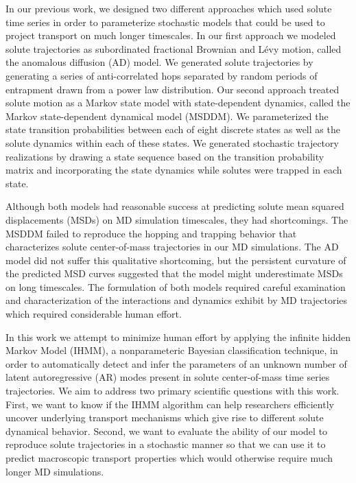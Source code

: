 \documentclass{article}
\begin{document}
  
  In our previous work, we designed two different approaches which used
  solute time series in order to parameterize stochastic models that could be used
  to project transport on much longer timescales. In our first approach we modeled 
  solute trajectories as subordinated fractional Brownian and L\'evy motion, called
  the anomalous diffusion (AD) model. We generated solute trajectories by generating
  a series of anti-correlated hops separated by random periods of entrapment drawn 
  from a power law distribution. Our second approach treated solute motion as a Markov
  state model with state-dependent dynamics, called the Markov state-dependent dynamical
  model (MSDDM). We parameterized the state transition probabilities between
  each of eight discrete states as well as the solute dynamics within each of these
  states. We generated stochastic trajectory realizations by drawing a state
  sequence based on the transition probability matrix and incorporating the state dynamics
  while solutes were trapped in each state.
  
  Although both models had reasonable success at predicting solute mean squared 
  displacements (MSDs) on MD simulation timescales, they had shortcomings.
  The MSDDM failed to reproduce the hopping and trapping behavior that
  characterizes solute center-of-mass trajectories in our MD simulations.
  The AD model did not suffer this qualitative shortcoming, but the persistent 
  curvature of the predicted MSD curves suggested that the model might 
  underestimate MSDs on long timescales. The formulation of both models required
  careful examination and characterization of the interactions and dynamics exhibit
  by MD trajectories which required considerable human effort.
  
  In this work we attempt to minimize human effort by applying the infinite hidden 
  Markov Model (IHMM), a nonparameteric Bayesian classification technique, in order to 
  automatically detect and infer the parameters of an unknown number of latent
  autoregressive (AR) modes present in solute center-of-mass time series trajectories.
  We aim to address two primary scientific questions with this work. First, we want
  to know if the IHMM algorithm can help researchers efficiently uncover underlying
  transport mechanisms which give rise to different solute dynamical behavior.
  Second, we want to evaluate the ability of our model to reproduce solute trajectories
  in a stochastic manner so that we can use it to predict macroscopic transport 
  properties which would otherwise require much longer MD simulations.
  
\end{document}
